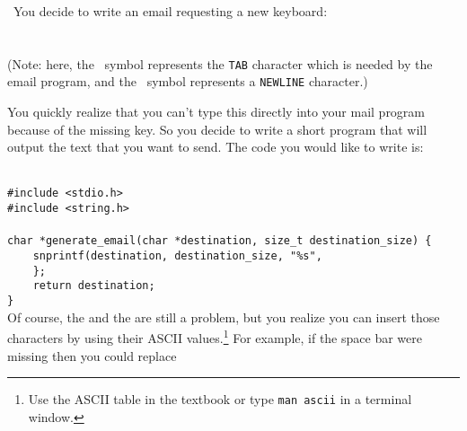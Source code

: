 \transitionzero\
You decide to write an email requesting a new keyboard: \\
\\
\email \\
(Note: here, the \tab\ symbol represents the \texttt{TAB} character which is needed by the email program, and the \nl\ symbol represents a \texttt{NEWLINE} character.)

You quickly realize that you can't type this directly into your mail program because of the missing \textit{\texttt{\missingKey}} key.
So you decide to write a short program that will output the text that you want to send.
The code you would like to write is:

\phantom{x}\\
\lstinline{#include <stdio.h>} \\
\lstinline{#include <string.h>} \\
\phantom{x}\\
\lstinline{char *generate_email(char *destination, size_t destination_size) {} \\
\lstinline{    snprintf(destination, destination_size, "%s",} \\
\cString
\verb`    };` \\
\lstinline{    return destination;} \\
\verb`}` \\

%


Of course, the \texttt{\missingKey} and the \texttt{\lowercaseKey} are still a problem, but you realize you can insert those characters by using their ASCII values.\footnote{Use the ASCII table in the textbook or type \texttt{man ascii} in a terminal window.}
For example, if the space bar were missing then you could replace

